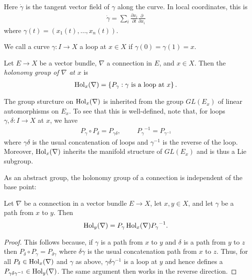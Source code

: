 \documentclass{article}
\begin{document}
Here $\dot\gamma$ is the tangent vector field of $\gamma$ along the curve.
In local coordinates, this is
\begin{align*}
  \dot\gamma = \sum_i \frac{\partial x_i}{\partial t} \frac{\partial}{\partial x_i}
\end{align*}
where $\gamma(t) = (x_1(t),\ldots,x_n(t))$.

We call a curve $\gamma : I\to X$ a loop at $x\in X$ if $\gamma(0)=\gamma(1)=x$.

\begin{definition}
  Let $E\to X$ be a vector bundle, $\nabla$ a connection in $E$,
  and $x\in X$. Then the \emph{holonomy group of $\nabla$ at $x$}
  is
  \begin{align*}
    \operatorname{Hol}_x(\nabla) = \left\lbrace{P_\gamma : \text{$\gamma$ is a loop at $x$}}\right\rbrace.
  \end{align*}
\end{definition}

The group sturcture on $\operatorname{Hol}_x(\nabla)$ is inherited from the group $GL(E_x)$ of linear automorphisms on $E_x$. To see that this is well-defined, note
that, for loops $\gamma,\delta : I \to X$ at $x$, we have
\begin{align*}
  P_\gamma\circ P_\delta = P_{\gamma\delta}, \hspace{1cm}
  {P_\gamma}^{-1} = P_{{\gamma}^{-1}}
\end{align*}
where $\gamma\delta$ is the usual concatenation of loops and ${\gamma}^{-1}$
is the reverse of the loop. Moreover, $\operatorname{Hol}_x(\nabla)$ inherits the
manifold structure of $GL(E_x)$ and is thus a Lie subgroup.

As an abstract group, the holonomy group of a connection is independent
of the base point:

\begin{lemma}
  Let $\nabla$ be a connection in a vector bundle $E\to X$, let $x,y\in X$,
  and let $\gamma$ be a path from $x$ to $y$. Then
  \begin{align*}
    \operatorname{Hol}_y(\nabla)=P_\gamma \operatorname{Hol}_x(\nabla){P_\gamma}^{-1}.
  \end{align*}
  \begin{proof}
    This follows because, if $\gamma$ is a path from $x$ to $y$ and
    $\delta$ is a path from $y$ to $z$ then $P_\delta \circ P_\gamma = P_{\delta\gamma}$ where $\delta\gamma$ is the usual concatenation path from
    $x$ to $z$. Thus, for all $P_\delta\in\operatorname{Hol}_x(\nabla)$ and $\gamma$
    as above, $\gamma\delta{\gamma}^{-1}$ is a loop at $y$ and hence
    defines a $P_{\gamma\delta{\gamma}^{-1}}\in\operatorname{Hol}_y(\nabla)$. The
    same argument then works in the reverse direction.
  \end{proof}
\end{lemma}
\end{document}
